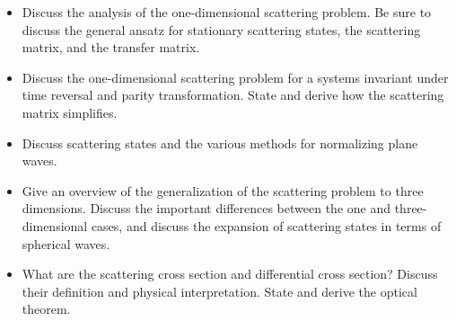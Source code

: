 \begin{itemize}

    \item Discuss the analysis of the one-dimensional scattering problem. Be sure to discuss the general ansatz for stationary scattering states, the scattering matrix, and the transfer matrix.

    \item Discuss the one-dimensional scattering problem for a systems invariant under time reversal and parity transformation. State and derive how the scattering matrix simplifies.

    \item Discuss scattering states and the various methods for normalizing plane waves.

    \item Give an overview of the generalization of the scattering problem to three dimensions. Discuss the important differences between the one and three-dimensional cases, and discuss the expansion of scattering states in terms of spherical waves.

    \item What are the scattering cross section and differential cross section? Discuss their definition and physical interpretation. State and derive the optical theorem.

\end{itemize}



